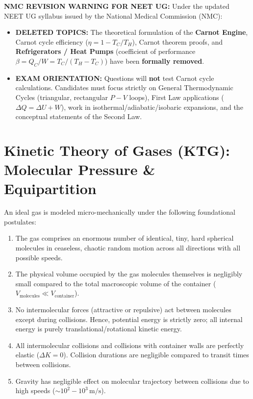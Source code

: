\documentclass[10pt,twoside,openright]{book}
\begin{document}
\begin{trapbox}
\textbf{NMC REVISION WARNING FOR NEET UG:}
Under the updated NEET UG syllabus issued by the National Medical Commission (NMC):
\begin{itemize}
  \item \textbf{DELETED TOPICS:} The theoretical formulation of the \textbf{Carnot Engine}, Carnot cycle efficiency ($\eta = 1 - T_C/T_H$), Carnot theorem proofs, and \textbf{Refrigerators / Heat Pumps} (coefficient of performance $\beta = Q_C/W = T_C/(T_H - T_C)$) have been \textbf{formally removed}.
  \item \textbf{EXAM ORIENTATION:} Questions will \textbf{not} test Carnot cycle calculations. Candidates must focus strictly on General Thermodynamic Cycles (triangular, rectangular $P-V$ loops), First Law applications ($\Delta Q = \Delta U + W$), work in isothermal/adiabatic/isobaric expansions, and the conceptual statements of the Second Law.
\end{itemize}
\end{trapbox}

\section{Kinetic Theory of Gases (KTG): Molecular Pressure \& Equipartition}

\begin{conceptbox}
An ideal gas is modeled micro-mechanically under the following foundational postulates:
\begin{enumerate}
  \item The gas comprises an enormous number of identical, tiny, hard spherical molecules in ceaseless, chaotic random motion across all directions with all possible speeds.
  \item The physical volume occupied by the gas molecules themselves is negligibly small compared to the total macroscopic volume of the container ($V_{\text{molecules}} \ll V_{\text{container}}$).
  \item No intermolecular forces (attractive or repulsive) act between molecules except during collisions. Hence, potential energy is strictly zero; all internal energy is purely translational/rotational kinetic energy.
  \item All intermolecular collisions and collisions with container walls are perfectly elastic ($\Delta K = 0$). Collision durations are negligible compared to transit times between collisions.
  \item Gravity has negligible effect on molecular trajectory between collisions due to high speeds ($\sim 10^2 - 10^3\,\mathrm{m/s}$).
\end{enumerate}
\end{conceptbox}
\end{document}

